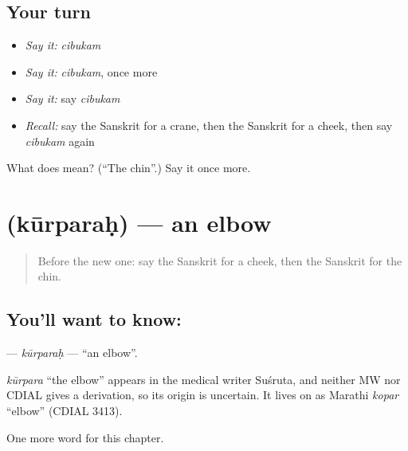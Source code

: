\subsection*{Your turn}
\begin{itemize}
\raggedright
  \item \emph{Say it:} \emph{cibukam}
  \item \emph{Say it:} \emph{cibukam}, once more
  \item \emph{Say it:} say \emph{cibukam}
  \item \emph{Recall:} say the Sanskrit for a crane, then the Sanskrit for a cheek, then say \emph{cibukam} again
\end{itemize}

\begin{tcolorbox}[breakable,colback=teal!4,colframe=teal!35!black,title={Before you move on}]
What does  mean? (\textquotedblleft{}The chin\textquotedblright{}.) Say it once more.
\end{tcolorbox}
\section[\texorpdfstring{\sk{कूर्परः} (kūrparaḥ)}{कूर्परः (kūrparaḥ)}]{ (kūrparaḥ) — an elbow}

\label{lesson:SA-C116-kurparah}



\begin{quote}
Before the new one: say the Sanskrit for a cheek, then the Sanskrit for the chin.
\end{quote}

\subsection*{You'll want to know: }
\textbf{} — \emph{kūrparaḥ} — \textquotedblleft{}an elbow\textquotedblright{}.

\begin{cousinweb}
\emph{kūrpara} \textquotedblleft{}the elbow\textquotedblright{} appears in the medical writer Suśruta, and neither MW nor CDIAL gives a derivation, so its origin is uncertain. It lives on as Marathi \emph{kopar} \textquotedblleft{}elbow\textquotedblright{} (CDIAL 3413).
\end{cousinweb}

\begin{grammarlens}[title={What you've built}]
One more word for this chapter.
\end{grammarlens}

